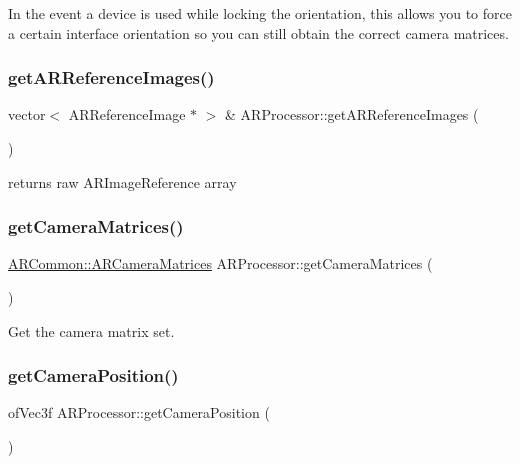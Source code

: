 In the event a device is used while locking the orientation, this allows you to force a certain interface orientation so you can still obtain the correct camera matrices. \mbox{\label{class_a_r_processor_a07f2f86123829bee3b92115a0636855c}} 
\subsubsection{\texorpdfstring{get\+A\+R\+Reference\+Images()}{getARReferenceImages()}}
{\footnotesize\ttfamily vector$<$ A\+R\+Reference\+Image $\ast$ $>$ \& A\+R\+Processor\+::get\+A\+R\+Reference\+Images (\begin{DoxyParamCaption}{ }\end{DoxyParamCaption})}



returns raw A\+R\+Image\+Reference array 

\mbox{\label{class_a_r_processor_a82a9b334360ebccd844e7cf5584eff8b}} 
\subsubsection{\texorpdfstring{get\+Camera\+Matrices()}{getCameraMatrices()}}
{\footnotesize\ttfamily \mbox{\hyperlink{struct_a_r_common_1_1_a_r_camera_matrices}{A\+R\+Common\+::\+A\+R\+Camera\+Matrices}} A\+R\+Processor\+::get\+Camera\+Matrices (\begin{DoxyParamCaption}{ }\end{DoxyParamCaption})}



Get the camera matrix set. 

\mbox{\label{class_a_r_processor_a06030d617c338b3c395c48498733ddb7}} 
\subsubsection{\texorpdfstring{get\+Camera\+Position()}{getCameraPosition()}}
{\footnotesize\ttfamily of\+Vec3f A\+R\+Processor\+::get\+Camera\+Position (\begin{DoxyParamCaption}{ }\end{DoxyParamCaption})}



